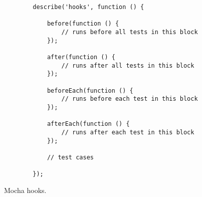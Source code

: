 
\begin{figure}[H]
	\centering
	\begin{lstlisting}
		describe('hooks', function () {

			before(function () {
				// runs before all tests in this block
			});

			after(function () {
				// runs after all tests in this block
			});

			beforeEach(function () {
				// runs before each test in this block
			});

			afterEach(function () {
				// runs after each test in this block
			});

			// test cases

		});
	\end{lstlisting}
	\caption[Mocha hooks]{Mocha hooks.}
	\label{fig:mocha_hooks}
\end{figure}

